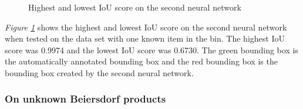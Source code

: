 \begin{figure}[h]
    \centering
    \hspace{0.5cm}
    \caption{Highest and lowest IoU score on the second neural network}
    \label{figure: v2bestworst}
\end{figure}

\textit{Figure \ref{figure: v2bestworst}} shows the highest and lowest IoU score on the second neural network when tested on the data set with one known item in the bin. The highest IoU score was 0.9974 and the lowest IoU score was 0.6730. The green bounding box is the automatically annotated bounding box and the red bounding box is the bounding box created by the second neural network.

\clearpage
\subsubsection{On unknown Beiersdorf products}

